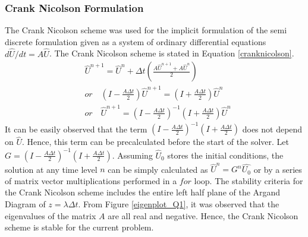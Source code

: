 \documentclass[12pt,dvipsnames]{article}
\begin{document}
\subsubsection{Crank Nicolson Formulation}
The Crank Nicolson scheme was used for the implicit formulation of the semi discrete formulation given as a system of ordinary differential equations $d \hat{U}/dt = A \hat{U}$. The Crank Nicolson scheme is stated in Equation \ref{cranknicolson}.
\begin{equation}
    \begin{aligned}
        & \hat{U}^{n + 1} = \hat{U}^n + \Delta t \left( \frac{A \hat{U}^{n + 1} + A \hat{U}^{n} }{2} \right) \\
        & or \quad \left( I - \frac{A \Delta t}{2} \right) \hat{U}^{n + 1} = \left( I + \frac{A \Delta t}{2} \right) \hat{U}^n \\
        & or \quad \hat{U}^{n + 1} = \left( I - \frac{A \Delta t}{2} \right)^{-1} \left( I + \frac{A \Delta t}{2} \right) \hat{U}^n
    \end{aligned}
    \label{cranknicolson}
\end{equation}
It can be easily observed that the term $\left( I - \frac{A \Delta t}{2} \right)^{-1} \left( I + \frac{A \Delta t}{2} \right)$ does not depend on $\hat{U}$. Hence, this term can be precalculated before the start of the solver. Let $G = \left( I - \frac{A \Delta t}{2} \right)^{-1} \left( I + \frac{A \Delta t}{2} \right)$. Assuming $\hat{U}_0$ stores the initial conditions, the solution at any time level $n$ can be simply calculated as $\hat{U}^n = G^n \hat{U_0}$ or by a series of matrix vector multiplications performed in a $for$ loop.
The stability criteria for the Crank Nicolson scheme includes the entire left half plane of the Argand Diagram of $z = \lambda \Delta t$. From Figure \ref{eigenplot_Q1}, it was observed that the eigenvalues of the matrix $A$ are all real and negative. Hence, the Crank Nicolson scheme is stable for the current problem.
\end{document}
